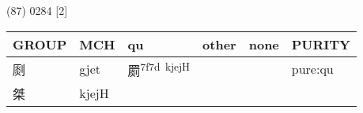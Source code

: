 \documentclass[14pt,a4paper]{scrartcl}
\begin{document}
(87) 0284 {[}2{]}

\begin{longtable}[c]{@{}llllll@{}}
\toprule
\begin{minipage}[b]{0.14\columnwidth}\raggedright\strut
GROUP
\strut\end{minipage} &
\begin{minipage}[b]{0.14\columnwidth}\raggedright\strut
MCH
\strut\end{minipage} &
\begin{minipage}[b]{0.14\columnwidth}\raggedright\strut
qu
\strut\end{minipage} &
\begin{minipage}[b]{0.14\columnwidth}\raggedright\strut
other
\strut\end{minipage} &
\begin{minipage}[b]{0.14\columnwidth}\raggedright\strut
none
\strut\end{minipage} &
\begin{minipage}[b]{0.14\columnwidth}\raggedright\strut
PURITY
\strut\end{minipage}\tabularnewline
\midrule
\endhead
\begin{minipage}[t]{0.14\columnwidth}\raggedright\strut
㓹
\strut\end{minipage} &
\begin{minipage}[t]{0.14\columnwidth}\raggedright\strut
gjet
\strut\end{minipage} &
\begin{minipage}[t]{0.14\columnwidth}\raggedright\strut
罽\textsuperscript{7f7d~kjejH}
\strut\end{minipage} &
\begin{minipage}[t]{0.14\columnwidth}\raggedright\strut
\strut\end{minipage} &
\begin{minipage}[t]{0.14\columnwidth}\raggedright\strut
\strut\end{minipage} &
\begin{minipage}[t]{0.14\columnwidth}\raggedright\strut
pure:qu
\strut\end{minipage}\tabularnewline
\begin{minipage}[t]{0.14\columnwidth}\raggedright\strut
桀
\strut\end{minipage} &
\begin{minipage}[t]{0.14\columnwidth}\raggedright\strut
kjejH
\strut\end{minipage} &
\begin{minipage}[t]{0.14\columnwidth}\raggedright\strut
\strut\end{minipage} &

\end{longtable}
\end{document}
